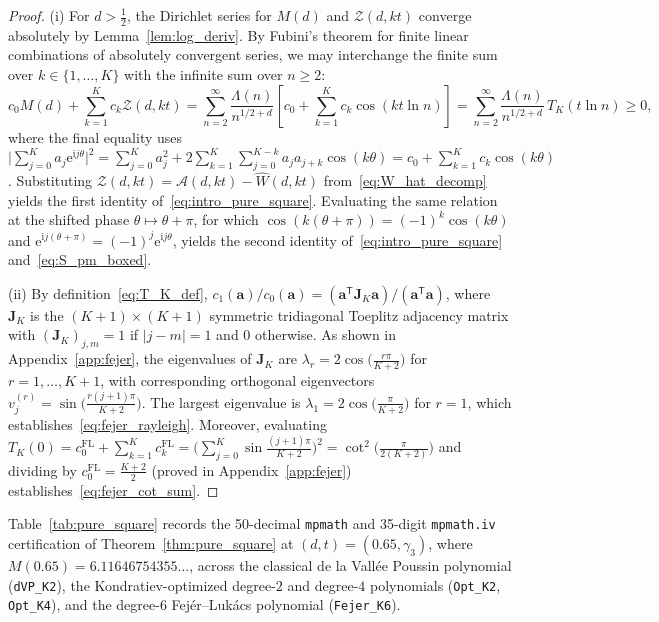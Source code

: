 \documentclass[11pt,reqno]{amsart}
\theoremstyle{definition}
\theoremstyle{remark}
\numberwithin{equation}{section}
\newcommand{\ee}{\mathrm{e}}
\newcommand{\ii}{\mathrm{i}}
\begin{document}
\begin{proof}
(i) For $d > \frac{1}{2}$, the Dirichlet series for $M(d)$ and $\mathcal{Z}(d,kt)$ converge absolutely by Lemma~\ref{lem:log_deriv}. By Fubini's theorem for finite linear combinations of absolutely convergent series, we may interchange the finite sum over $k \in \{1, \dots, K\}$ with the infinite sum over $n \ge 2$:
\[
c_0 M(d) + \sum_{k=1}^K c_k \mathcal{Z}(d,kt) = \sum_{n=2}^{\infty} \frac{\Lambda(n)}{n^{1/2+d}}\left[c_0 + \sum_{k=1}^K c_k\cos(kt\ln n)\right] = \sum_{n=2}^{\infty} \frac{\Lambda(n)}{n^{1/2+d}}\,T_K(t\ln n) \ge 0,
\]
where the final equality uses $\bigl|\sum_{j=0}^K a_j \ee^{\ii j\theta}\bigr|^2 = \sum_{j=0}^K a_j^2 + 2\sum_{k=1}^K \sum_{j=0}^{K-k} a_j a_{j+k}\cos(k\theta) = c_0 + \sum_{k=1}^K c_k\cos(k\theta)$. Substituting $\mathcal{Z}(d,kt) = \mathcal{A}(d,kt) - \widehat{W}(d,kt)$ from~\eqref{eq:W_hat_decomp} yields the first identity of~\eqref{eq:intro_pure_square}. Evaluating the same relation at the shifted phase $\theta \mapsto \theta + \pi$, for which $\cos(k(\theta+\pi)) = (-1)^k\cos(k\theta)$ and $\ee^{\ii j(\theta+\pi)} = (-1)^j\ee^{\ii j\theta}$, yields the second identity of~\eqref{eq:intro_pure_square} and~\eqref{eq:S_pm_boxed}.

(ii) By definition~\eqref{eq:T_K_def}, $c_1(\mathbf{a})/c_0(\mathbf{a}) = (\mathbf{a}^{\mathsf{T}}\mathbf{J}_K\mathbf{a})/(\mathbf{a}^{\mathsf{T}}\mathbf{a})$, where $\mathbf{J}_K$ is the $(K+1) \times (K+1)$ symmetric tridiagonal Toeplitz adjacency matrix with $(\mathbf{J}_K)_{j,m} = 1$ if $|j-m| = 1$ and $0$ otherwise. As shown in Appendix~\ref{app:fejer}, the eigenvalues of $\mathbf{J}_K$ are $\lambda_r = 2\cos\bigl(\frac{r\pi}{K+2}\bigr)$ for $r = 1, \dots, K+1$, with corresponding orthogonal eigenvectors $v_j^{(r)} = \sin\bigl(\frac{r(j+1)\pi}{K+2}\bigr)$. The largest eigenvalue is $\lambda_1 = 2\cos\bigl(\frac{\pi}{K+2}\bigr)$ for $r = 1$, which establishes~\eqref{eq:fejer_rayleigh}. Moreover, evaluating $T_K(0) = c_0^{\mathrm{FL}} + \sum_{k=1}^K c_k^{\mathrm{FL}} = \bigl(\sum_{j=0}^K \sin\frac{(j+1)\pi}{K+2}\bigr)^2 = \cot^2\bigl(\frac{\pi}{2(K+2)}\bigr)$ and dividing by $c_0^{\mathrm{FL}} = \frac{K+2}{2}$ (proved in Appendix~\ref{app:fejer}) establishes~\eqref{eq:fejer_cot_sum}.
\end{proof}

Table~\ref{tab:pure_square} records the 50-decimal \texttt{mpmath} and 35-digit \texttt{mpmath.iv} certification of Theorem~\ref{thm:pure_square} at $(d, t) = (0.65, \gamma_3)$, where $M(0.65) = 6.11646754355\dots$, across the classical de la Vall\'ee Poussin polynomial (\texttt{dVP\_K2}), the Kondratiev-optimized degree-$2$ and degree-$4$ polynomials (\texttt{Opt\_K2}, \texttt{Opt\_K4}), and the degree-$6$ Fej\'er--Luk\'acs polynomial (\texttt{Fejer\_K6}).
\end{document}
